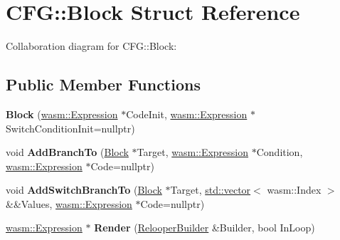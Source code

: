 \hypertarget{struct_c_f_g_1_1_block}{}\section{C\+FG\+:\+:Block Struct Reference}
\label{struct_c_f_g_1_1_block}


Collaboration diagram for C\+FG\+:\+:Block\+:
\subsection*{Public Member Functions}
\begin{DoxyCompactItemize}
\item 
\mbox{\label{struct_c_f_g_1_1_block_a4d1897f583e2ed12ad55ca5ef6bcf32f}} 
{\bfseries Block} (\mbox{\hyperlink{classwasm_1_1_expression}{wasm\+::\+Expression}} $\ast$Code\+Init, \mbox{\hyperlink{classwasm_1_1_expression}{wasm\+::\+Expression}} $\ast$Switch\+Condition\+Init=nullptr)
\item 
\mbox{\label{struct_c_f_g_1_1_block_a11842ecfdcf79279159e11127d147c37}} 
void {\bfseries Add\+Branch\+To} (\mbox{\hyperlink{struct_c_f_g_1_1_block}{Block}} $\ast$Target, \mbox{\hyperlink{classwasm_1_1_expression}{wasm\+::\+Expression}} $\ast$Condition, \mbox{\hyperlink{classwasm_1_1_expression}{wasm\+::\+Expression}} $\ast$Code=nullptr)
\item 
\mbox{\label{struct_c_f_g_1_1_block_a0c03d66c59db4bbd17a7174444bd6ef2}} 
void {\bfseries Add\+Switch\+Branch\+To} (\mbox{\hyperlink{struct_c_f_g_1_1_block}{Block}} $\ast$Target, \mbox{\hyperlink{classstd_1_1vector}{std\+::vector}}$<$ wasm\+::\+Index $>$ \&\&Values, \mbox{\hyperlink{classwasm_1_1_expression}{wasm\+::\+Expression}} $\ast$Code=nullptr)
\item 
\mbox{\label{struct_c_f_g_1_1_block_ac968e2c4ba6aa9ef0b1fea34c110d552}} 
\mbox{\hyperlink{classwasm_1_1_expression}{wasm\+::\+Expression}} $\ast$ {\bfseries Render} (\mbox{\hyperlink{class_c_f_g_1_1_relooper_builder}{Relooper\+Builder}} \&Builder, bool In\+Loop)
\end{DoxyCompactItemize}

